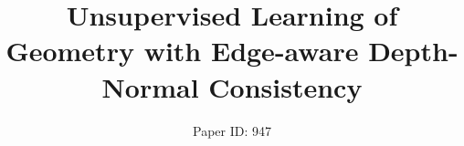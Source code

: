 \documentclass[letterpaper]{article}
\begin{document}
\title{Unsupervised Learning of Geometry with Edge-aware Depth-Normal Consistency}
\author{Paper ID: 947}
\maketitle






% 





\newpage



\end{document}
